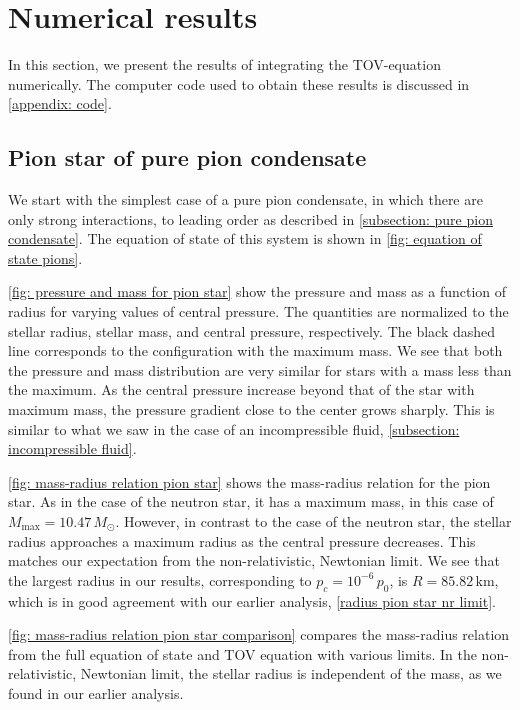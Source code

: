 \section{Numerical results}


In this section, we present the results of integrating the TOV-equation numerically.
The computer code used to obtain these results is discussed in \autoref{appendix: code}.

\subsection{Pion star of pure pion condensate}


We start with the simplest case of a pure pion condensate, in which there are only strong interactions, to leading order as described in \autoref{subsection: pure pion condensate}.
The equation of state of this system is shown in \autoref{fig: equation of state pions}.

\autoref{fig: pressure and mass for pion star} show the pressure and mass as a function of radius for varying values of central pressure.
The quantities are normalized to the stellar radius, stellar mass, and central pressure, respectively.
The black dashed line corresponds to the configuration with the maximum mass.
We see that both the pressure and mass distribution are very similar for stars with a mass less than the maximum.
As the central pressure increase beyond that of the star with maximum mass, the pressure gradient close to the center grows sharply.
This is similar to what we saw in the case of an incompressible fluid, \autoref{subsection: incompressible fluid}.

\autoref{fig: mass-radius relation pion star} shows the mass-radius relation for the pion star.
As in the case of the neutron star, it has a maximum mass, in this case of $M_\text{max} = 10.47\, M_\odot$.
However, in contrast to the case of the neutron star, the stellar radius approaches a maximum radius as the central pressure decreases.
This matches our expectation from the non-relativistic, Newtonian limit.
We see that the largest radius in our results, corresponding to  $p_c = 10^{-6} \, p_0$, is $R = 85.82 \, \text{km}$, which is in good agreement with our earlier analysis, \autoref{radius pion star nr limit}.

\autoref{fig: mass-radius relation pion star comparison} compares the mass-radius relation from the full equation of state and TOV equation with various limits.
In the non-relativistic, Newtonian limit, the stellar radius is independent of the mass, as we found in our earlier analysis.


